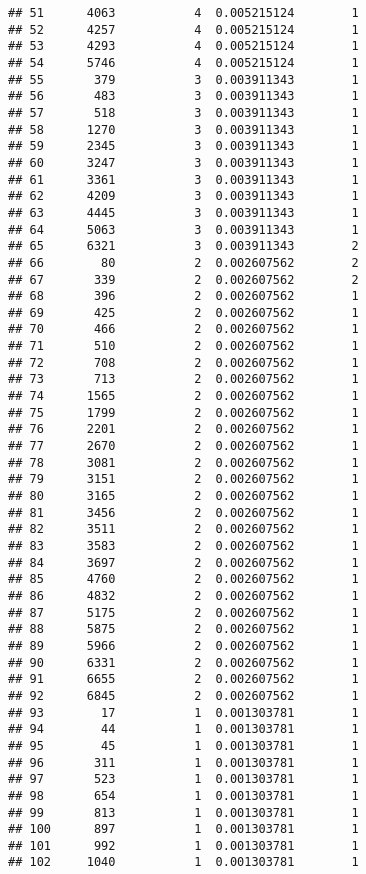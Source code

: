 \documentclass[
]{article}
\begin{document}
\begin{verbatim}
## 51      4063           4  0.005215124        1
## 52      4257           4  0.005215124        1
## 53      4293           4  0.005215124        1
## 54      5746           4  0.005215124        1
## 55       379           3  0.003911343        1
## 56       483           3  0.003911343        1
## 57       518           3  0.003911343        1
## 58      1270           3  0.003911343        1
## 59      2345           3  0.003911343        1
## 60      3247           3  0.003911343        1
## 61      3361           3  0.003911343        1
## 62      4209           3  0.003911343        1
## 63      4445           3  0.003911343        1
## 64      5063           3  0.003911343        1
## 65      6321           3  0.003911343        2
## 66        80           2  0.002607562        2
## 67       339           2  0.002607562        2
## 68       396           2  0.002607562        1
## 69       425           2  0.002607562        1
## 70       466           2  0.002607562        1
## 71       510           2  0.002607562        1
## 72       708           2  0.002607562        1
## 73       713           2  0.002607562        1
## 74      1565           2  0.002607562        1
## 75      1799           2  0.002607562        1
## 76      2201           2  0.002607562        1
## 77      2670           2  0.002607562        1
## 78      3081           2  0.002607562        1
## 79      3151           2  0.002607562        1
## 80      3165           2  0.002607562        1
## 81      3456           2  0.002607562        1
## 82      3511           2  0.002607562        1
## 83      3583           2  0.002607562        1
## 84      3697           2  0.002607562        1
## 85      4760           2  0.002607562        1
## 86      4832           2  0.002607562        1
## 87      5175           2  0.002607562        1
## 88      5875           2  0.002607562        1
## 89      5966           2  0.002607562        1
## 90      6331           2  0.002607562        1
## 91      6655           2  0.002607562        1
## 92      6845           2  0.002607562        1
## 93        17           1  0.001303781        1
## 94        44           1  0.001303781        1
## 95        45           1  0.001303781        1
## 96       311           1  0.001303781        1
## 97       523           1  0.001303781        1
## 98       654           1  0.001303781        1
## 99       813           1  0.001303781        1
## 100      897           1  0.001303781        1
## 101      992           1  0.001303781        1
## 102     1040           1  0.001303781        1

\end{verbatim}
\end{document}
